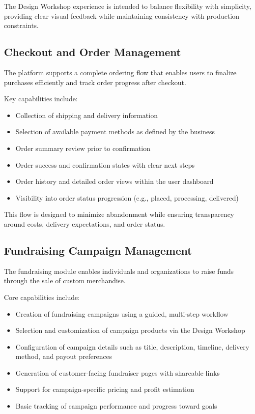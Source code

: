 The Design Workshop experience is intended to balance flexibility with simplicity,
providing clear visual feedback while maintaining consistency with production
constraints.

\subsection{Checkout and Order Management}

The platform supports a complete ordering flow that enables users to finalize
purchases efficiently and track order progress after checkout.

Key capabilities include:
\begin{itemize}[leftmargin=1.5em]
    \item Collection of shipping and delivery information
    \item Selection of available payment methods as defined by the business
    \item Order summary review prior to confirmation
    \item Order success and confirmation states with clear next steps
    \item Order history and detailed order views within the user dashboard
    \item Visibility into order status progression (e.g., placed, processing, delivered)
\end{itemize}

This flow is designed to minimize abandonment while ensuring transparency
around costs, delivery expectations, and order status.

\subsection{Fundraising Campaign Management}

The fundraising module enables individuals and organizations to raise funds
through the sale of custom merchandise.

Core capabilities include:
\begin{itemize}[leftmargin=1.5em]
    \item Creation of fundraising campaigns using a guided, multi-step workflow
    \item Selection and customization of campaign products via the Design Workshop
    \item Configuration of campaign details such as title, description, timeline,
    delivery method, and payout preferences
    \item Generation of customer-facing fundraiser pages with shareable links
    \item Support for campaign-specific pricing and profit estimation
    \item Basic tracking of campaign performance and progress toward goals
\end{itemize}


